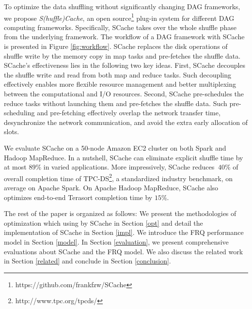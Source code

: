 {\color{black}
To optimize the data shuffling without significantly changing DAG frameworks, we propose \emph{S(huffle)Cache}, an open source\footnote{https://github.com/frankfzw/SCache} plug-in system for different DAG computing frameworks.
Specifically, SCache takes over the whole shuffle phase from the underlying framework.
The workflow of a DAG framework with SCache is presented in Figure \ref{fig:workflow}. 
SCache replaces the disk operations of shuffle write by the memory copy in map tasks and pre-fetches the shuffle data.
SCache's effectiveness lies in the following two key ideas.
First, SCache decouples the shuffle write and read from both map and reduce tasks.
Such decoupling effectively enables more flexible resource management and better multiplexing between the computational and I/O resources.
Second, SCache pre-schedules the reduce tasks without launching them and pre-fetches the shuffle data. 
Such pre-scheduling and pre-fetching effectively overlap the network transfer time, desynchronize the network communication, 
and avoid the extra early allocation of slots.

We evaluate SCache on a 50-node Amazon EC2 cluster on both Spark and Hadoop MapReduce.
In a nutshell, SCache can eliminate explicit shuffle time by at most $89\%$ in varied applications. More impressively, SCache reduces $~40\%$ of overall completion time of TPC-DS\footnote{http://www.tpc.org/tpcds/}, a standardized industry benchmark, on average on Apache Spark. On Apache Hadoop MapReduce, SCache also optimizes end-to-end Terasort completion time by $15\%$.


The rest of the paper is organized as follows:
{\color{black}
We present the methodologies of optimization which using by SCache in Section \ref{opt} and detail the implementation of SCache in Section \ref{impl}.
We introduce the FRQ performance model in Section \ref{model}.
In Section \ref{evaluation}, we present comprehensive evaluations about SCache and the FRQ model.
We also discuss the related work in Section \ref{related} and conclude in Section \ref{conclusion}.
}
}

